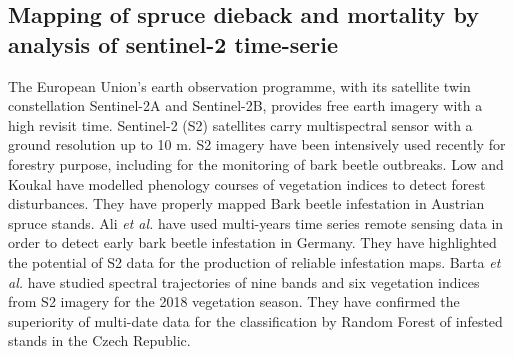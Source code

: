 \documentclass[3p,times]{elsarticle}
\begin{document}
\subsection{Mapping of spruce dieback and mortality by analysis of sentinel-2 time-serie}


The European Union’s earth observation programme, with its satellite twin constellation Sentinel-2A and Sentinel-2B, provides free earth imagery with a high revisit time. 
Sentinel-2 (S2) satellites carry multispectral sensor with a ground resolution up to 10 m. 
S2 imagery have been intensively used recently for forestry purpose, including for the monitoring of bark beetle outbreaks. 
Low and Koukal \citep{low_phenology_2020} have modelled phenology courses of vegetation indices to detect forest disturbances. 
They have properly mapped Bark beetle infestation in Austrian spruce stands.
Ali \textit{et al.} \citep{ali_canopy_2021} have used multi-years time series remote sensing data in order to detect early bark beetle infestation in Germany. 
They have highlighted the potential of S2 data for the production of reliable infestation maps.
Barta \textit{et al.} \citep{barta_early_2021} have studied spectral trajectories of nine bands and six vegetation indices from S2 imagery for the 2018 vegetation season. 
They have confirmed the superiority of multi-date data for the classification by Random Forest of infested stands in the Czech Republic.
\end{document}
